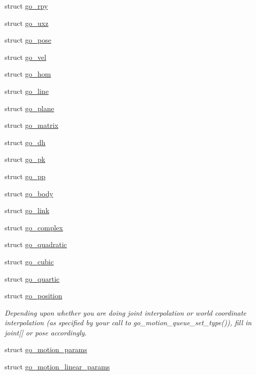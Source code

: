 \begin{DoxyCompactItemize}
\item 
struct \hyperlink{structgomotion_1_1go__rpy}{go\-\_\-rpy}
\item 
struct \hyperlink{structgomotion_1_1go__uxz}{go\-\_\-uxz}
\item 
struct \hyperlink{structgomotion_1_1go__pose}{go\-\_\-pose}
\item 
struct \hyperlink{structgomotion_1_1go__vel}{go\-\_\-vel}
\item 
struct \hyperlink{structgomotion_1_1go__hom}{go\-\_\-hom}
\item 
struct \hyperlink{structgomotion_1_1go__line}{go\-\_\-line}
\item 
struct \hyperlink{structgomotion_1_1go__plane}{go\-\_\-plane}
\item 
struct \hyperlink{structgomotion_1_1go__matrix}{go\-\_\-matrix}
\item 
struct \hyperlink{structgomotion_1_1go__dh}{go\-\_\-dh}
\item 
struct \hyperlink{structgomotion_1_1go__pk}{go\-\_\-pk}
\item 
struct \hyperlink{structgomotion_1_1go__pp}{go\-\_\-pp}
\item 
struct \hyperlink{structgomotion_1_1go__body}{go\-\_\-body}
\item 
struct \hyperlink{structgomotion_1_1go__link}{go\-\_\-link}
\item 
struct \hyperlink{structgomotion_1_1go__complex}{go\-\_\-complex}
\item 
struct \hyperlink{structgomotion_1_1go__quadratic}{go\-\_\-quadratic}
\item 
struct \hyperlink{structgomotion_1_1go__cubic}{go\-\_\-cubic}
\item 
struct \hyperlink{structgomotion_1_1go__quartic}{go\-\_\-quartic}
\item 
struct \hyperlink{structgomotion_1_1go__position}{go\-\_\-position}
\begin{DoxyCompactList}\small\item\em Depending upon whether you are doing joint interpolation or world coordinate interpolation (as specified by your call to go\-\_\-motion\-\_\-queue\-\_\-set\-\_\-type()), fill in joint\mbox{[}\mbox{]} or pose accordingly. \end{DoxyCompactList}\item 
struct \hyperlink{structgomotion_1_1go__motion__params}{go\-\_\-motion\-\_\-params}
\item 
struct \hyperlink{structgomotion_1_1go__motion__linear__params}{go\-\_\-motion\-\_\-linear\-\_\-params}

\end{DoxyCompactItemize}
